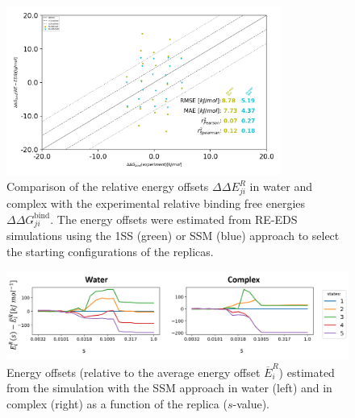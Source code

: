 \begin{figure}[h]
\centering
  \includegraphics[width=0.8\textwidth]{fig/results/ringOpening/paramOptimization/RingClosure_system_Eoff_final_results.png}
\caption{Comparison of the relative energy offsets $\Delta \Delta E^R_{ji}$ in water and complex with the experimental relative binding free energies $\Delta \Delta G^\text{bind}_{ji}$. The energy offsets were estimated from RE-EDS simulations using the 1SS (green) or SSM (blue) approach to select the starting configurations of the replicas.} \label{SIfig:Eoff_experiment_corr_RingOpening}
\end{figure}

\begin{figure}[h]
\centering
  \includegraphics[width=1.0\textwidth]{fig/results/ringOpening/paramOptimization/CHK1_shuffle_eoffs.png}
\caption{Energy offsets (relative to the average energy offset $\overline{E}^R_i$) estimated from the simulation with the SSM approach in water (left) and in complex (right) as a function of the replica ($s$-value).} \label{SIfig:Eoff-perreplica}
\end{figure}




\newpage

